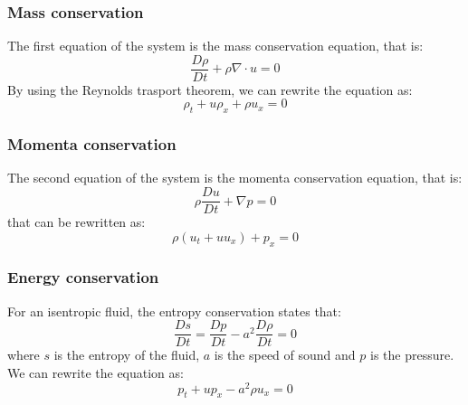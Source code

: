 \documentclass{report}
\begin{document}
\subsubsection*{Mass conservation}
The first equation of the system is the mass conservation equation, that is:
\begin{equation*}
    \frac{D\rho}{Dt} + \rho \nabla \cdot u = 0
\end{equation*}
By using the Reynolds trasport theorem, we can rewrite the equation as:
\begin{equation*}
    \rho_t + u\rho_x + \rho u_x = 0
\end{equation*}
\subsubsection*{Momenta conservation}
The second equation of the system is the momenta conservation equation, that is:
\begin{equation*}
    \rho\frac{Du}{Dt} + \nabla p = 0
\end{equation*}
that can be rewritten as:
\begin{equation*}
    \rho (u_t + u u_x) + p_x = 0
\end{equation*}

\subsubsection*{Energy conservation}
For an isentropic fluid, the entropy conservation states that:
\begin{equation*}
    \frac{Ds}{Dt} = \frac{Dp}{Dt} - a^2 \frac{D\rho}{Dt} = 0
\end{equation*}
where $s$ is the entropy of the fluid, $a$ is the speed of sound and $p$ is the pressure. We can rewrite the equation as:
\begin{equation*}
    p_t + u p_x - a^2 \rho u_x = 0
\end{equation*}
\end{document}
